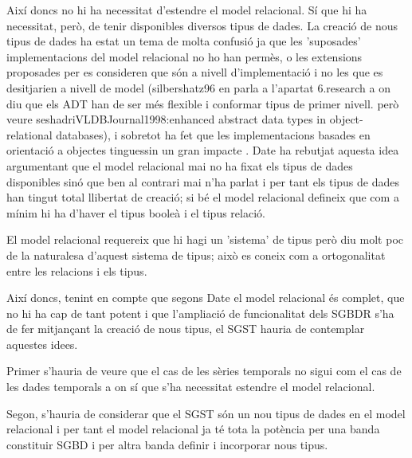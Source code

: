 

Així doncs no hi ha necessitat d'estendre el model relacional. Sí que hi ha necessitat, però, de tenir disponibles diversos tipus de dades. La creació de nous tipus de dades ha estat un tema de molta confusió ja que les 'suposades' implementacions del model relacional no ho han permès, o les extensions proposades per \textcite{stonebraker86} es consideren que són a nivell d'implementació i no les que es desitjarien a nivell de model (silbershatz96 en parla a l'apartat 6.research a on diu que els ADT han de ser més flexible i conformar tipus de primer nivell. però veure seshadriVLDBJournal1998:enhanced abstract data types in object-relational databases), i sobretot ha fet que les implementacions basades en orientació a objectes tinguessin un gran impacte . Date ha rebutjat aquesta idea argumentant que el model relacional mai no ha fixat els tipus de dades disponibles sinó que ben al contrari mai n'ha parlat i per tant els tipus de dades han tingut total llibertat de creació; si bé el model relacional defineix que com a mínim hi ha d'haver el tipus booleà i el tipus relació.

El model relacional requereix que hi hagi un 'sistema' de tipus però diu molt poc de la naturalesa d'aquest sistema de tipus; això es coneix com a ortogonalitat entre les relacions i els tipus.



Així doncs, tenint en compte que segons Date el model relacional és complet, que no hi ha cap de tant potent i que l'ampliació de funcionalitat dels SGBDR s'ha de fer mitjançant la creació de nous tipus, el SGST hauria de contemplar aquestes idees. 

Primer s'hauria de veure que el cas de les sèries temporals no sigui com el cas de les dades temporals a on sí que s'ha necessitat estendre el model relacional.

Segon, s'hauria de considerar que el SGST són un nou tipus de dades en el model relacional i per tant el model relacional ja té tota la potència per una banda constituir SGBD i per altra banda definir i incorporar nous tipus.


